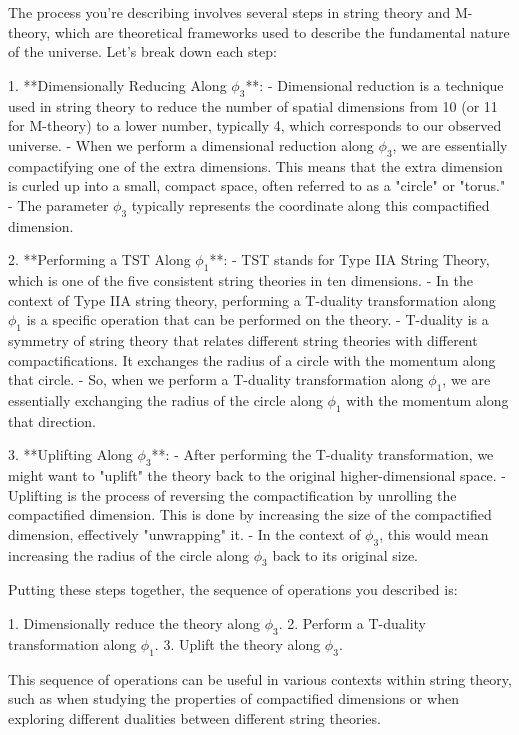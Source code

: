 The process you're describing involves several steps in string theory and M-theory, which are theoretical frameworks used to describe the fundamental nature of the universe. Let's break down each step:

1. **Dimensionally Reducing Along \(\phi_3\)**:
   - Dimensional reduction is a technique used in string theory to reduce the number of spatial dimensions from 10 (or 11 for M-theory) to a lower number, typically 4, which corresponds to our observed universe.
   - When we perform a dimensional reduction along \(\phi_3\), we are essentially compactifying one of the extra dimensions. This means that the extra dimension is curled up into a small, compact space, often referred to as a "circle" or "torus."
   - The parameter \(\phi_3\) typically represents the coordinate along this compactified dimension.

2. **Performing a TST Along \(\phi_1\)**:
   - TST stands for Type IIA String Theory, which is one of the five consistent string theories in ten dimensions.
   - In the context of Type IIA string theory, performing a T-duality transformation along \(\phi_1\) is a specific operation that can be performed on the theory.
   - T-duality is a symmetry of string theory that relates different string theories with different compactifications. It exchanges the radius of a circle with the momentum along that circle.
   - So, when we perform a T-duality transformation along \(\phi_1\), we are essentially exchanging the radius of the circle along \(\phi_1\) with the momentum along that direction.

3. **Uplifting Along \(\phi_3\)**:
   - After performing the T-duality transformation, we might want to "uplift" the theory back to the original higher-dimensional space.
   - Uplifting is the process of reversing the compactification by unrolling the compactified dimension. This is done by increasing the size of the compactified dimension, effectively "unwrapping" it.
   - In the context of \(\phi_3\), this would mean increasing the radius of the circle along \(\phi_3\) back to its original size.

Putting these steps together, the sequence of operations you described is:

1. Dimensionally reduce the theory along \(\phi_3\).
2. Perform a T-duality transformation along \(\phi_1\).
3. Uplift the theory along \(\phi_3\).

This sequence of operations can be useful in various contexts within string theory, such as when studying the properties of compactified dimensions or when exploring different dualities between different string theories.